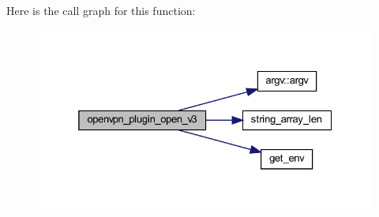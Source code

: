 Here is the call graph for this function\+:
\nopagebreak
\begin{figure}[H]
\begin{center}
\leavevmode
\includegraphics[width=325pt]{auth-pam_8c_ac88c8a386b00fdf4f28f36048cbb8c5c_cgraph}
\end{center}
\end{figure}


